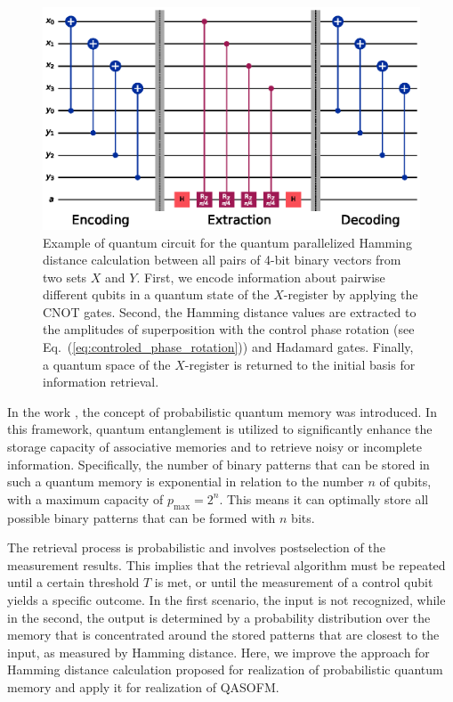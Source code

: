\documentclass[pra,showkeys,twocolumn,showpacs,aps,10pt]{revtex4-1}
\begin{document}
\begin{figure}[t]
  \includegraphics[width=\columnwidth]{qcircuit.eps}
  \caption{%
    Example of quantum circuit for the quantum parallelized Hamming distance calculation between all pairs of 4-bit binary vectors from two sets ${X}$ and ${Y}$.
    First, we encode information about pairwise different qubits in a quantum state of the $X$-register by applying the CNOT gates.
    Second, the Hamming distance values are extracted to the amplitudes of superposition with the control phase rotation (see Eq.~(\ref{eq:controled_phase_rotation})) and Hadamard gates.
    Finally, a quantum space of the $X$-register is returned to the initial basis for information retrieval.
  }
  \label{fig:qcircuit}
\end{figure}





In the work \cite{trugenberger2001}, the concept of probabilistic quantum memory was introduced. In this framework, quantum entanglement is utilized to significantly enhance the storage capacity of associative memories and to retrieve noisy or incomplete information. Specifically, the number of binary patterns that can be stored in such a quantum memory is exponential in relation to the number $ n $ of qubits, with a maximum capacity of $ p_{\text{max}} = 2^n $. This means it can optimally store all possible binary patterns that can be formed with $ n $ bits.

The retrieval process is probabilistic and involves postselection of the measurement results. This implies that the retrieval algorithm must be repeated until a certain threshold $T$ is met, or until the measurement of a control qubit yields a specific outcome. In the first scenario, the input is not recognized, while in the second, the output is determined by a probability distribution over the memory that is concentrated around the stored patterns that are closest to the input, as measured by Hamming distance. Here, we improve the approach for Hamming distance calculation proposed for realization of probabilistic quantum memory\cite{trugenberger2001} and apply it for realization of QASOFM.
\end{document}
